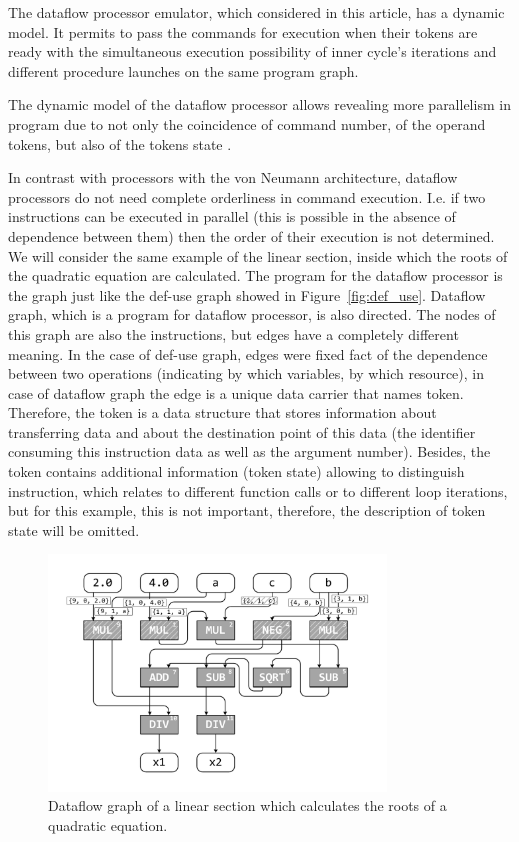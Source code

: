 \documentclass[
11pt,%
tightenlines,%
twoside,%
onecolumn,%
nofloats,%
nobibnotes,%
nofootinbib,%
superscriptaddress,%
noshowpacs,%
centertags]%
{revtex4}
\begin{document}
The dataflow processor emulator, which considered in this article, has a dynamic model.
It permits to pass the commands for execution when their tokens are ready with the simultaneous execution possibility of inner cycle’s iterations and different procedure launches on the same program graph.

The dynamic model of the dataflow processor allows revealing more parallelism in program due to not only the coincidence of command number, of the operand tokens, but also of the tokens state \cite{Wiley}.

In contrast with processors with the von Neumann architecture, dataflow processors do not need complete orderliness in command execution.
I.e. if two instructions can be executed in parallel (this is possible in the absence of dependence between them) then the order of their execution is not determined.
We will consider the same example of the linear section, inside which the roots of the quadratic equation are calculated.
The program for the dataflow processor is the graph just like the def-use graph showed in Figure~\ref{fig:def_use}.
Dataflow graph, which is a program for dataflow processor, is also directed.
The nodes of this graph are also the instructions, but edges have a completely different meaning.
In the case of def-use graph, edges were fixed fact of the dependence between two operations (indicating by which variables, by which resource), in case of dataflow graph the edge is a unique data carrier that names token.
Therefore, the token is a data structure that stores information about transferring data and about the destination point of this data (the identifier consuming this instruction data as well as the argument number).
Besides, the token contains additional information (token state) allowing to distinguish instruction, which relates to different function calls or to different loop iterations, but for this example, this is not important, therefore, the description of token state will be omitted.

\begin{figure}[h]
\setcaptionmargin{5mm}
\onelinecaptionsfalse %
\includegraphics[width=0.80\textwidth]{pics/dataflow.pdf}
\caption{Dataflow graph of a linear section which calculates the roots of a quadratic equation.}\label{fig:dataflow}
\end{figure}
\end{document}
